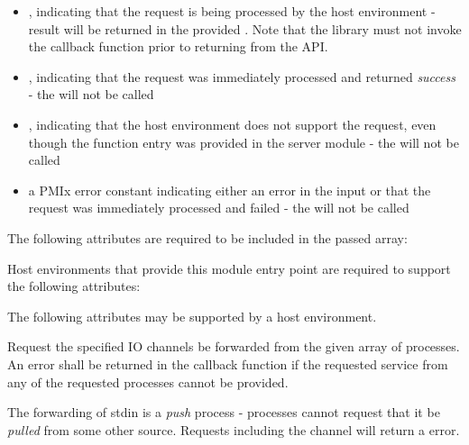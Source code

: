 \begin{itemize}
    \item {}, indicating that the request is being processed by the host environment - result will be returned in the provided . Note that the library must not invoke the callback function prior to returning from the \ac{API}.
    \item {}, indicating that the request was immediately processed and returned \textit{success} - the  will not be called
    \item {}, indicating that the host environment does not support the request, even though the function entry was provided in the server module - the  will not be called
    \item a PMIx error constant indicating either an error in the input or that the request was immediately processed and failed - the  will not be called
\end{itemize}


\reqattrstart
The following attributes are required to be included in the passed  array:


\divider

Host environments that provide this module entry point are required to support the following attributes:


\reqattrend

\optattrstart
The following attributes may be supported by a host environment.


\optattrend

\descr

Request the specified IO channels be forwarded from the given array of processes. An error shall be returned in the callback function if the requested service from any of the requested processes cannot be provided.

\adviceimplstart
The forwarding of stdin is a \textit{push} process - processes cannot request that it be \textit{pulled} from some other source. Requests including the  channel will return a  error.
\adviceimplend

